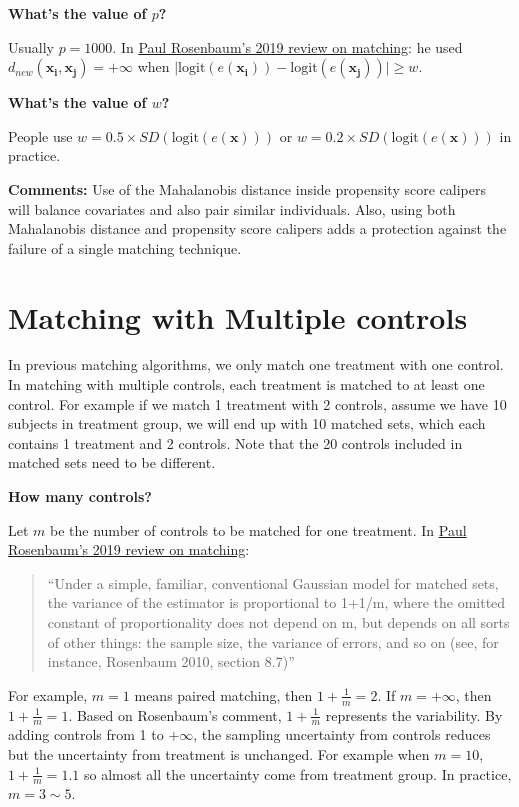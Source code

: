 \documentclass[
]{book}
\begin{document}
\textbf{What's the value of \(p\)?}

Usually \(p = 1000\). In \href{https://www.annualreviews.org/doi/abs/10.1146/annurev-statistics-031219-041058}{Paul Rosenbaum's 2019 review on matching}: he used \(d_{new}(\mathbf{x_i}, \mathbf{x_j}) = +\infty\) when \(\big|\text{logit}(e(\mathbf{x_i}))-\text{logit}(e(\mathbf{x_j}))\big| \geq w\).

\textbf{What's the value of \(w\)?}

People use \(w = 0.5 \times SD(\text{logit}(e(\mathbf{x})))\) or \(w = 0.2 \times SD(\text{logit}(e(\mathbf{x})))\) in practice.

\textbf{Comments:} Use of the Mahalanobis distance inside propensity score calipers will balance covariates and also pair similar individuals. Also, using both Mahalanobis distance and propensity score calipers adds a protection against the failure of a single matching technique.

\hypertarget{matching-with-multiple-controls}{%
\section{Matching with Multiple controls}\label{matching-with-multiple-controls}}

In previous matching algorithms, we only match one treatment with one control. In matching with multiple controls, each treatment is matched to at least one control. For example if we match 1 treatment with 2 controls, assume we have 10 subjects in treatment group, we will end up with 10 matched sets, which each contains 1 treatment and 2 controls. Note that the 20 controls included in matched sets need to be different.

\textbf{How many controls?}

Let \(m\) be the number of controls to be matched for one treatment. In \href{https://www.annualreviews.org/doi/abs/10.1146/annurev-statistics-031219-041058}{Paul Rosenbaum's 2019 review on matching}:

\begin{quote}
``Under a simple, familiar, conventional Gaussian model for matched sets, the variance of the estimator is proportional to 1+1/m, where the omitted constant of proportionality does not depend on m, but depends on all sorts of other things: the sample size, the variance of errors, and so on (see, for instance, Rosenbaum 2010, section 8.7)''
\end{quote}

For example, \(m=1\) means paired matching, then \(1+\frac{1}{m} = 2\). If \(m = +\infty\), then \(1+\frac{1}{m} = 1\). Based on Rosenbaum's comment, \(1+\frac{1}{m}\) represents the variability. By adding controls from 1 to \(+\infty\), the sampling uncertainty from controls reduces but the uncertainty from treatment is unchanged. For example when \(m=10\), \(1+\frac{1}{m} = 1.1\) so almost all the uncertainty come from treatment group. In practice, \(m = 3 \sim 5\).
\end{document}
